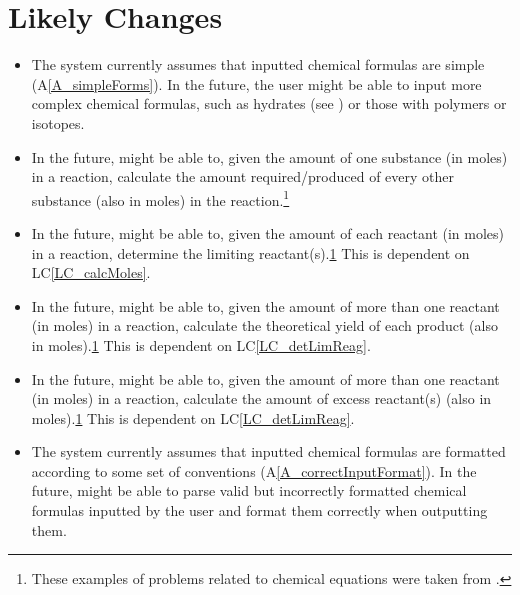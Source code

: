 \documentclass[12pt]{article}
\newcommand{\aref}[1]{A\ref{#1}}
\newcounter{lcnum} %
\newcommand{\lcref}[1]{LC\ref{#1}}
\begin{document}
\newpage

\section{Likely Changes} \label{sec_LCs}

\begin{itemize}

  \item[LC\refstepcounter{lcnum}\thelcnum\label{LC_complexForms}:] The system
    currently assumes that inputted chemical formulas are simple
    (\aref{A_simpleForms}). In the future, the user might
    be able to input more complex chemical formulas, such as hydrates (see
    ) or those with polymers or isotopes.

  \item[LC\refstepcounter{lcnum}\thelcnum\label{LC_calcMoles}:] In the future,
    \progname{} might be able to, given the amount of one substance (in moles)
    in a reaction, calculate the amount required/produced of every other
    substance (also in moles) in the reaction.\footnote{
      \label{chemProbExs}These examples of problems related to
      chemical equations were taken from \cite{lund_introduction_2023}.}

  \item[LC\refstepcounter{lcnum}\thelcnum\label{LC_detLimReag}:] In the future,
    \progname{} might be able to, given the amount
    of each reactant (in moles) in a reaction,
    determine the limiting reactant(s).\cref{chemProbExs}
    This is dependent on \lcref{LC_calcMoles}.

  \item[LC\refstepcounter{lcnum}\thelcnum\label{LC_calcYield}:] In the future,
    \progname{} might be able to, given the amount
    of more than one reactant (in moles) in a reaction,
    calculate the theoretical yield of each product (also in
    moles).\cref{chemProbExs} This is dependent on \lcref{LC_detLimReag}.

  \item[LC\refstepcounter{lcnum}\thelcnum\label{LC_calcExcess}:] In the future,
    \progname{} might be able to, given the amount
    of more than one reactant (in moles) in a reaction,
    calculate the amount of excess reactant(s) (also in	moles).\cref{chemProbExs}
    This is dependent on \lcref{LC_detLimReag}.

  \item[LC\refstepcounter{lcnum}\thelcnum\label{LC_incorrectInputFormat}:]
    The system currently assumes that inputted chemical formulas are formatted
    according to some set of conventions
    (\aref{A_correctInputFormat}). In the future, \progname{} might be able to
    parse valid but incorrectly formatted chemical formulas inputted by the
    user and format them correctly when outputting them.


\end{itemize}
\end{document}
